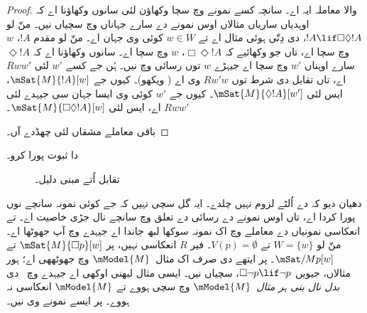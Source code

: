 \documentclass[../../../include/open-logic-section]{subfiles}
\begin{document}
\begin{proof}
   والا معاملہ ایہ اے۔ سانچہ کسے نمونے وچ سچا وکھاؤن لئی سانوں وکھاؤنا اے کہ اوہدیاں ساریاں مثالاں اوس نمونے دے سارے جہاناں وچ سچیاں نیں۔ منّ لو $!A \lif \Box\Diamond !A$،  دی دِتّی ہوئی مثال اے تے $w \in W$ کوئی وی جہان اے۔ منّ لو مقدم $!A$، $w$ وچ سچا اے، تاں جو وکھائیے کہ $\Box \Diamond
  !A$، $w$ وچ سچا اے۔ سانوں وکھاؤنا اے کہ $\Diamond !A$ سارے اوہناں $w'$ وچ سچا اے جیہڑے $w$ توں رسائی وچ نیں۔ ہُن جے کسے $w'$ لئی $Rww'$ اے، تاں تقابل دی شرط توں $Rw'w$ وی اے ( ویکھو)۔ کیوں جے $\mSat{M}{!A}[w]$، ایس لئی
  $\mSat{M}{\Diamond !A}[w']$۔ کیوں جے $w'$ کوئی وی ایسا جہان سی جیہدے لئی $Rww'$ اے، ایس لئی $\mSat{M}{\Box\Diamond!A}[w]$۔

  باقی معاملے مشقاں لئی چھڈدے آں۔
\end{proof}

\begin{prob}
   دا ثبوت پورا کرو۔
\end{prob}

\begin{figure}
  \begin{center}
  \end{center}
\caption{تقابل اُتے مبنی دلیل۔}
\end{figure}

دھیان دیو کہ  دے اُلٹے لزوم نہیں چلدے۔ ایہ گل سچی نہیں کہ جے کوئی نمونہ سانچے نوں پورا کردا اے، تاں اوس نمونے دے رسائی دے تعلق وچ سانچے نال جڑی خاصیت اے۔  تے انعکاسی نمونیاں دے معاملے وچ اک نمونہ سوکھا لبھ جاندا اے جیہدے وچ  آپ جھوٹھا اے۔ منّ لو $W = \{w\}$ تے
$V(p) = \emptyset$۔ فیر $R$ انعکاسی نہیں، پر $\mSat{M}{\Box
  p}[w]$ تے $\mSat/{M}{p}[w]$۔ پر ایتھے  دی صرف اک مثال~$\mModel{M}$ وچ جھوٹھھی اے؛ ہور مثالاں، جیویں
$\Box \lnot p \lif \lnot p$، سچیاں نیں۔ ایسی مثال لبھنی اوکھی اے جیہدے وچ~ دی \emph{بدل نال بنی ہر مثال}~$\mModel{M}$ وچ سچی ہووے تے $\mModel{M}$ انعکاسی نہ ہووے۔ پر ایسے نمونے وی نیں۔
\end{document}
